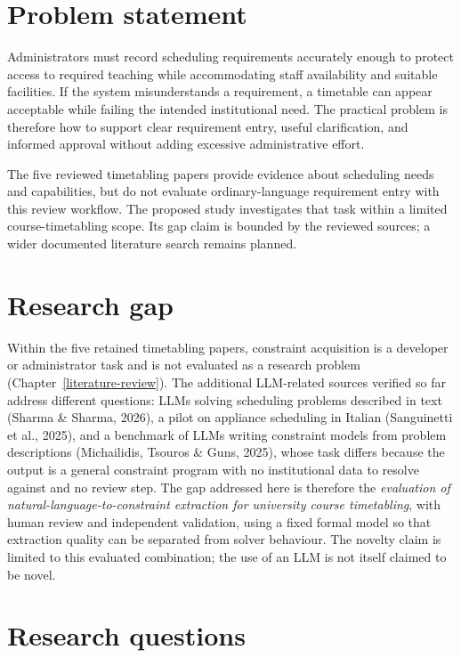 \documentclass[
  11pt,a4paper,oneside]{report}
\begin{document}
\hypertarget{problem-statement}{%
\section{Problem statement}\label{problem-statement}}

Administrators must record scheduling requirements accurately enough to protect access to required teaching while accommodating staff availability and suitable facilities. If the system misunderstands a requirement, a timetable can appear acceptable while failing the intended institutional need. The practical problem is therefore how to support clear requirement entry, useful clarification, and informed approval without adding excessive administrative effort.

The five reviewed timetabling papers provide evidence about scheduling needs and capabilities, but do not evaluate ordinary-language requirement entry with this review workflow. The proposed study investigates that task within a limited course-timetabling scope. Its gap claim is bounded by the reviewed sources; a wider documented literature search remains planned.

\hypertarget{research-gap}{%
\section{Research gap}\label{research-gap}}

Within the five retained timetabling papers, constraint acquisition is a developer or
administrator task and is not evaluated as a research problem (Chapter~\ref{literature-review}). The additional LLM-related sources verified so far address
different questions: LLMs solving scheduling problems described in text
(Sharma \& Sharma, 2026), a pilot on appliance scheduling in Italian
(Sanguinetti et al., 2025), and a benchmark of LLMs writing constraint
models from problem descriptions (Michailidis, Tsouros \& Guns, 2025),
whose task differs because the output is a general constraint program
with no institutional data to resolve against and no review step. The
gap addressed here is therefore the \emph{evaluation of
natural-language-to-constraint extraction for university course
timetabling}, with human review and independent validation, using a
fixed formal model so that extraction quality can be separated from
solver behaviour. The novelty claim is limited to this evaluated
combination; the use of an LLM is not itself claimed to be novel.

\hypertarget{research-questions}{%
\section{Research questions}\label{research-questions}}
\end{document}
